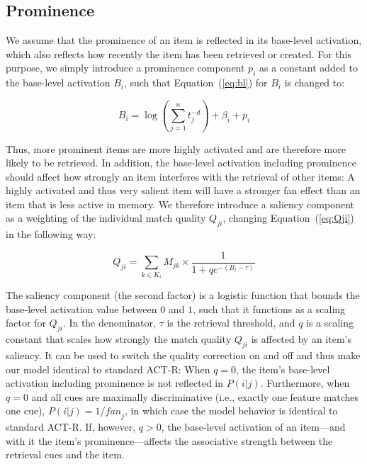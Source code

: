 \documentclass{cambridge7A}\usepackage[]{graphicx}\usepackage[]{color}
\begin{document}
\subsection{Prominence}

We assume that the prominence of an item is reflected in its base-level activation, which also reflects how recently the item has been retrieved or created.
For this purpose, we simply introduce a prominence component $p_i$ as a constant added to the base-level activation $B_i$, such that Equation~(\ref{eq:bl}) for $B_i$ is changed to:

\begin{equation}
  B_i = \log(\sum_{j=1}^n t_j^{-d}) + \beta_i + p_i \label{eq:bl2}
\end{equation}

Thus, more prominent items are more highly activated and are therefore more likely to be retrieved.
In addition, the base-level activation including prominence should affect how strongly an item interferes with the retrieval of other items: A highly activated and thus very salient item will have a stronger fan effect than an item that is less active in memory.
We therefore introduce a  saliency component as a weighting of the individual match quality $Q_{ji}$, changing Equation~(\ref{eq:Qji}) in the following way:

\begin{equation}
    Q_{ji} = \sum_{k \in K_i} M_{jk} \times \frac{1}{1+qe^{-(B_i-\tau)}} \label{eq:Qji2}
\end{equation}

The saliency component (the second factor) is a logistic function that bounds the base-level activation value between $0$ and $1$, such that it functions as a scaling factor for $Q_{ji}$.
In the denominator, $\tau$ is the retrieval threshold, and $q$ is a scaling constant that  scales how strongly the match quality $Q_{ji}$ is affected by an item's saliency. It can be used to switch the quality correction on and off and thus make our model identical to standard ACT-R: When $q = 0$, the item's base-level activation including prominence is not reflected in $P(i|j)$. Furthermore, when $q = 0$ and all cues are
 maximally discriminative (i.e., exactly one feature matches one cue), $P(i|j) = 1/\textit{fan}_j$, in which case the model behavior is identical to standard ACT-R.
If, however, $q>0$, the base-level activation of an item---and with it the item's prominence---affects the associative strength between the retrieval cues and the item. 
\end{document}
